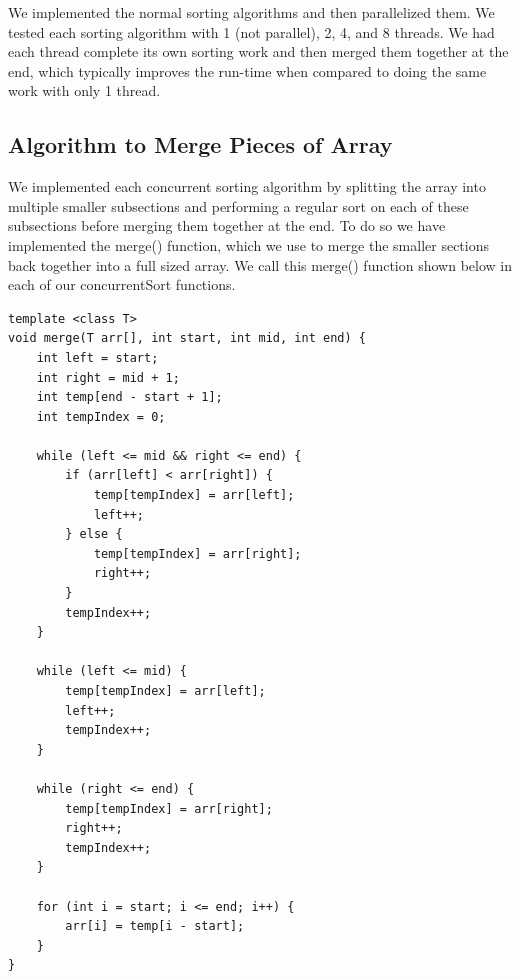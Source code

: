 \documentclass[conference]{IEEEtran}
\begin{document}
We implemented the normal sorting algorithms and then parallelized them. We tested each sorting algorithm with 1 (not parallel), 2, 4, and 8 threads. We had each thread complete its own sorting work and then merged them together at the end, which typically improves the run-time when compared to doing the same work with only 1 thread.

\subsection{Algorithm to Merge Pieces of Array}
We implemented each concurrent sorting algorithm by splitting the array into multiple smaller subsections and performing a regular sort on each of these subsections before merging them together at the end. To do so we have implemented the merge() function, which we use to merge the smaller sections back together into a full sized array. We call this merge() function shown below in each of our concurrentSort functions. 
\begin{lstlisting}
template <class T>
void merge(T arr[], int start, int mid, int end) {
    int left = start;
    int right = mid + 1;
    int temp[end - start + 1];
    int tempIndex = 0;

    while (left <= mid && right <= end) {
        if (arr[left] < arr[right]) {
            temp[tempIndex] = arr[left];
            left++;
        } else {
            temp[tempIndex] = arr[right];
            right++;
        }
        tempIndex++;
    }

    while (left <= mid) {
        temp[tempIndex] = arr[left];
        left++;
        tempIndex++;
    }

    while (right <= end) {
        temp[tempIndex] = arr[right];
        right++;
        tempIndex++;
    }

    for (int i = start; i <= end; i++) {
        arr[i] = temp[i - start];
    }
}
\end{lstlisting}
\end{document}
